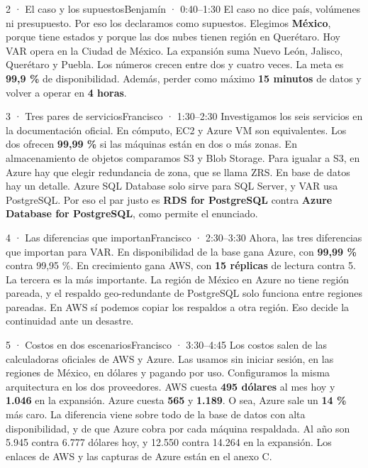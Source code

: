 \documentclass[11pt]{article}
\begin{document}
\begin{lamina}{2 · El caso y los supuestos}{Benjamín · 0:40--1:30}
El caso no dice país, volúmenes ni presupuesto. Por eso los declaramos como supuestos. Elegimos \textbf{México}, porque tiene estados y porque las dos nubes tienen región en Querétaro. Hoy VAR opera en la Ciudad de México. La expansión suma Nuevo León, Jalisco, Querétaro y Puebla. Los números crecen entre dos y cuatro veces. La meta es \textbf{99,9 \%} de disponibilidad. Además, perder como máximo \textbf{15 minutos} de datos y volver a operar en \textbf{4 horas}.
\end{lamina}

\begin{lamina}{3 · Tres pares de servicios}{Francisco · 1:30--2:30}
Investigamos los seis servicios en la documentación oficial. En cómputo, EC2 y Azure VM son equivalentes. Los dos ofrecen \textbf{99,99 \%} si las máquinas están en dos o más zonas. En almacenamiento de objetos comparamos S3 y Blob Storage. Para igualar a S3, en Azure hay que elegir redundancia de zona, que se llama ZRS. En base de datos hay un detalle. Azure SQL Database solo sirve para SQL Server, y VAR usa PostgreSQL. Por eso el par justo es \textbf{RDS for PostgreSQL} contra \textbf{Azure Database for PostgreSQL}, como permite el enunciado.
\end{lamina}

\begin{lamina}{4 · Las diferencias que importan}{Francisco · 2:30--3:30}
Ahora, las tres diferencias que importan para VAR. En disponibilidad de la base gana Azure, con \textbf{99,99 \%} contra 99,95 \%. En crecimiento gana AWS, con \textbf{15 réplicas} de lectura contra 5. La tercera es la más importante. La región de México en Azure no tiene región pareada, y el respaldo geo-redundante de PostgreSQL solo funciona entre regiones pareadas. En AWS sí podemos copiar los respaldos a otra región. Eso decide la continuidad ante un desastre.
\end{lamina}

\begin{lamina}{5 · Costos en dos escenarios}{Francisco · 3:30--4:45}
Los costos salen de las calculadoras oficiales de AWS y Azure. Las usamos sin iniciar sesión, en las regiones de México, en dólares y pagando por uso. Configuramos la misma arquitectura en los dos proveedores. AWS cuesta \textbf{495 dólares} al mes hoy y \textbf{1.046} en la expansión. Azure cuesta \textbf{565} y \textbf{1.189}. O sea, Azure sale un \textbf{14 \%} más caro. La diferencia viene sobre todo de la base de datos con alta disponibilidad, y de que Azure cobra por cada máquina respaldada. Al año son 5.945 contra 6.777 dólares hoy, y 12.550 contra 14.264 en la expansión. Los enlaces de AWS y las capturas de Azure están en el anexo C.
\end{lamina}
\end{document}
